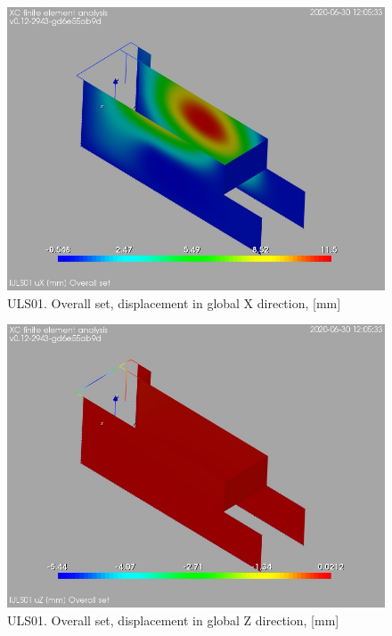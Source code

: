 \begin{figure}
\begin{center}
\includegraphics[width=\linewidth]{ramp_wall/resLC/text/graphics/resSimplLC/lULS01overallSetuX}
\caption{ULS01. Overall set, displacement in global X direction, [mm]}
\end{center}
\end{figure}
\begin{figure}
\begin{center}
\includegraphics[width=\linewidth]{ramp_wall/resLC/text/graphics/resSimplLC/lULS01overallSetuZ}
\caption{ULS01. Overall set, displacement in global Z direction, [mm]}
\end{center}
\end{figure}
